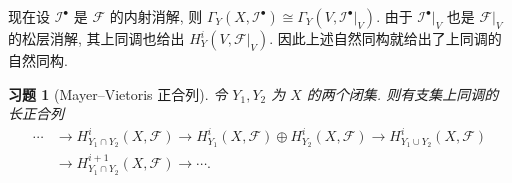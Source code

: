 \documentclass{article}
\theoremstyle{exercise}
\newtheorem{exercise}{习题}[section]
\theoremstyle{plain}
\theoremstyle{remark}
\newenvironment{proofc}{\proof}{\endproof}
\def\sF{\mathscr{F}}
\def\sI{\mathscr{I}}
\begin{document}
\begin{proofc}
\begin{enumerate}[label=(\arabic*)]
          现在设 $\sI^\bullet$ 是 $\sF$ 的内射消解,
          则 $\Gamma_Y(X, \sI^\bullet) \cong \Gamma_Y(V, \sI^\bullet|_V)$.
          由于 $\sI^\bullet|_V$ 也是 $\sF|_V$ 的松层消解,
          其上同调也给出 $H_Y^i(V, \sF|_V)$. 因此上述自然同构就给出了上同调的自然同构.
          \qedhere
  \end{enumerate}
\end{proofc}

\begin{exercise}[Mayer--Vietoris 正合列]
  令 $Y_1, Y_2$ 为 $X$ 的两个闭集. 则有支集上同调的长正合列
  \begin{align*}
    \cdots & \to H^i_{Y_1 \cap Y_2}(X, \sF)
              \to H^i_{Y_1}(X, \sF) \oplus H^i_{Y_2}(X, \sF)
              \to H^i_{Y_1 \cup Y_2}(X, \sF) \\
            & \to H^{i+1}_{Y_1 \cap Y_2}(X, \sF) \to \cdots.
  \end{align*}
\end{exercise}
\end{document}
